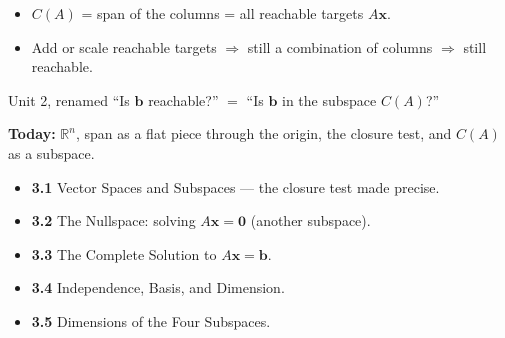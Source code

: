 \documentclass[aspectratio=169, 11pt]{beamer}
\newcommand{\zero}{\mathbf{0}}
\begin{document}
\begin{frame}[t, plain]
  \begin{itemize}
    \setlength{\itemsep}{6pt}
    \item $C(A)$ = span of the columns = all reachable targets $A\mathbf x$.
    \item Add or scale reachable targets $\Rightarrow$ still a combination of columns $\Rightarrow$ still reachable.
  \end{itemize}
  \vspace{4pt}
  \begin{block}{Unit 2, renamed}
    ``Is $\mathbf b$ reachable?'' $=$ ``Is $\mathbf b$ in the subspace $C(A)$?''
  \end{block}
\end{frame}

\begin{frame}[t, plain]
  \textbf{Today:} $\mathbb{R}^n$, span as a flat piece through the origin, the closure test, and $C(A)$ as a subspace.\\[8pt]
  \begin{itemize}
    \setlength{\itemsep}{4pt}
    \item \textbf{3.1} Vector Spaces and Subspaces --- the closure test made precise.
    \item \textbf{3.2} The Nullspace: solving $A\mathbf x=\zero$ (another subspace).
    \item \textbf{3.3} The Complete Solution to $A\mathbf x=\mathbf b$.
    \item \textbf{3.4} Independence, Basis, and Dimension.
    \item \textbf{3.5} Dimensions of the Four Subspaces.
  \end{itemize}
\end{frame}
\end{document}
